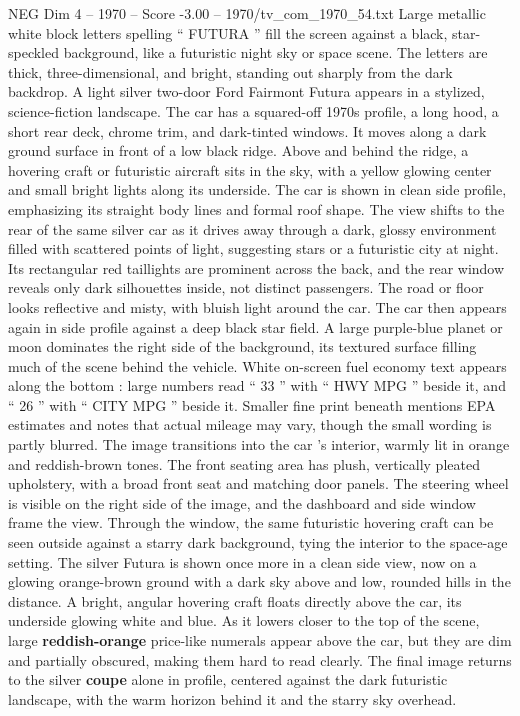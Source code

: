 \begin{textsample}{NEG Dim 4 – 1970 – Score -3.00 – 1970/tv\_com\_1970\_54.txt}  \label{ex:f4_neg_001}
Large metallic white block letters spelling “ FUTURA ” fill the screen against a black, star-speckled background, like a futuristic night sky or space scene.
The letters are thick, three-dimensional, and bright, standing out sharply from the dark backdrop.
A light silver two-door Ford Fairmont Futura appears in a stylized, science-fiction landscape.
The car has a squared-off 1970s profile, a long hood, a short rear deck, chrome trim, and dark-tinted windows.
It moves along a dark ground surface in front of a low black ridge.
Above and behind the ridge, a hovering craft or futuristic aircraft sits in the sky, with a yellow glowing center and small bright lights along its underside.
The car is shown in clean side profile, emphasizing its straight body lines and formal roof shape.
The view shifts to the rear of the same silver car as it drives away through a dark, glossy environment filled with scattered points of light, suggesting stars or a futuristic city at night.
Its rectangular red taillights are prominent across the back, and the rear window reveals only dark silhouettes inside, not distinct passengers.
The road or floor looks reflective and misty, with bluish light around the car.
The car then appears again in side profile against a deep black star field.
A large purple-blue planet or moon dominates the right side of the background, its textured surface filling much of the scene behind the vehicle.
White on-screen fuel economy text appears along the bottom : large numbers read “ 33 ” with “ HWY MPG ” beside it, and “ 26 ” with “ CITY MPG ” beside it.
Smaller fine print beneath mentions EPA estimates and notes that actual mileage may vary, though the small wording is partly blurred.
The image transitions into the car ’s interior, warmly lit in orange and reddish-brown tones.
The front seating area has plush, vertically pleated upholstery, with a broad front seat and matching door panels.
The steering wheel is visible on the right side of the image, and the dashboard and side window frame the view.
Through the window, the same futuristic hovering craft can be seen outside against a starry dark background, tying the interior to the space-age setting.
The silver Futura is shown once more in a clean side view, now on a glowing orange-brown ground with a dark sky above and low, rounded hills in the distance.
A bright, angular hovering craft floats directly above the car, its underside glowing white and blue.
As it lowers closer to the top of the scene, large \textbf{reddish-orange} price-like numerals appear above the car, but they are dim and partially obscured, making them hard to read clearly.
The final image returns to the silver \textbf{coupe} alone in profile, centered against the dark futuristic landscape, with the warm horizon behind it and the starry sky overhead.

\end{textsample}
